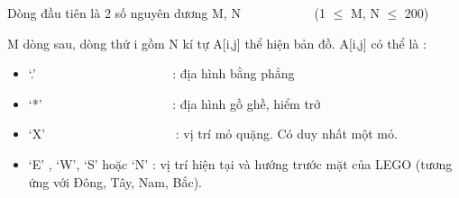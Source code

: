 \textbf{}   Dòng đầu tiên là 2 số nguyên dương M, N            (1  $\le$  M, N  $\le$  200)  

   M dòng sau, dòng thứ i gồm N kí tự A[i,j] thể hiện bản đồ. A[i,j] có thể là :  
\begin{itemize}
	\item     ‘.’                          : địa hình bằng phẳng   
	\item     ‘*’                         : địa hình gồ ghề, hiểm trở   
	\item     ‘X’                         : vị trí mỏ quặng. Có duy nhất một mỏ.   
	\item     ‘E’ , ‘W’, ‘S’ hoặc ‘N’ : vị trí hiện tại và hướng trước mặt của LEGO (tương ứng với Đông, Tây, Nam, Bắc).   
\end{itemize}